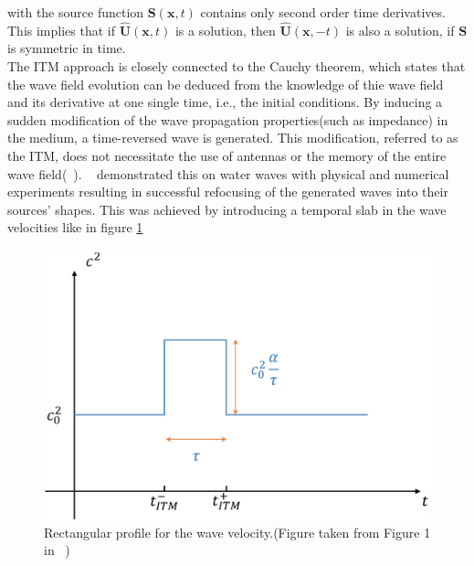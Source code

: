 with the source function $\mathbf{S}\left(\mathbf{x},t\right)$ contains only second order time derivatives. This implies that if $\hat{\mathbf{U}}\left(\mathbf{x},t\right)$
is a solution, then $\hat{\mathbf{U}}\left(\mathbf{x}, -t\right)$ is also a solution, if $\mathbf{S}$ is symmetric in time. \\

The \ac{ITM} approach is closely connected to the Cauchy theorem, which states that the wave field evolution can be deduced from the knowledge of thie wave field
and its derivative at one single time, i.e., the initial conditions. By inducing a sudden modification of the wave propagation properties(such as impedance) in the
medium, a time-reversed wave is generated. This modification, referred to as the \ac{ITM}, does not necessitate the use of antennas or the memory of the entire wave
field(~\parencite{Bacot2016}). ~\parencite{Bacot2016} demonstrated this on water waves with physical and numerical experiments resulting in successful refocusing of the generated waves into their
sources' shapes. This was achieved by introducing a temporal slab in the wave velocities like in figure \ref{fig:deltavelocity}

\begin{figure}
    \centering
    \includegraphics[width=0.6\linewidth]{figures/delta_speed.png}
    \caption{Rectangular profile for the wave velocity.(Figure taken from Figure 1 in ~\parencite[Supplementary Material]{Bacot2016})}
    \label{fig:deltavelocity}
\end{figure}